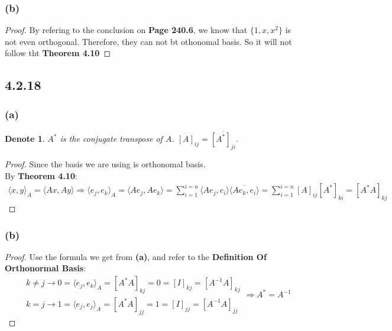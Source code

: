 \documentclass{article}
\newtheorem*{denote}{Denote}
\newtheorem*{proof}{Proof}
\begin{document}
\subsubsection*{(b)}
\begin{proof}
    By refering to the conclusion on \textbf{Page 240.6}, we know that $\{1, x, x^2\}$ is not even orthogonal. Therefore, they can not bt othonomal basis. So it will not follow tht \textbf{Theorem 4.10}
\end{proof}

\subsection*{4.2.18}
\subsubsection*{(a)}
\begin{denote}
    $A^*$ is the conjugate transpose of $A$. $[A]_{ij}= \overline {[A^*]_{ji}}$.
\end{denote}
\begin{proof}
    Since the basis we are using is orthonomal basis.  \\ By \textbf{Theorem 4.10}:
\begin{equation*}
    \begin{split}
        \langle x, y\rangle_A = \langle Ax, Ay\rangle \Rightarrow \langle e_j, e_k\rangle_A = \langle Ae_j, Ae_k\rangle = \sum_{i=1}^{i=n} 
    \langle Ae_j, e_i \rangle \overline {\langle Ae_k, e_i \rangle} = \sum_{i=1}^{i=n} [A]_{ij}[A^*]_{ki} = [A^*A]_{kj}
    \end{split}
\end{equation*}
\end{proof}

\subsubsection*{(b)}
\begin{proof}
    Use the formula we get from \textbf{(a)}, and refer to the \textbf{Definition Of Orthonormal Basis}: 
    \begin{equation*}
        \begin{split}
            & k \neq j \rightarrow 0 = \langle e_j, e_k\rangle_A = [A^*A]_{kj} = 0 = [I]_{kj} = [A^{-1}A]_{kj}\\
            & k = j \rightarrow 1 = \langle e_j, e_j\rangle_A = [A^*A]_{jj} = 1 = [I]_{jj} = [A^{-1}A]_{jj}
        \end{split}
        \Rightarrow A^* = A^{-1}
    \end{equation*}
\end{proof}
\end{document}
